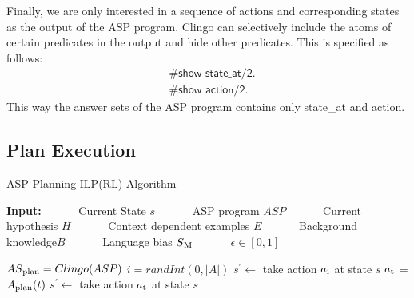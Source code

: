 Finally, we are only interested in a sequence of actions and corresponding states as the output of the ASP program. 
Clingo can selectively include the atoms of certain predicates in the output and hide other predicates. 
This is specified as follows:
\begin{equation}
\begin{split}
&\textsf{\#show state\_at/2.} \\
&\textsf{\#show action/2.}
\end{split}
\end{equation}
This way the answer sets of the ASP program contains only \textsf{state\_at} and \textsf{action}.

\subsection{Plan Execution}
\label{subsec:plan_execution}

\begin{algorithm}[!htb]
\caption{ASP Planning ILP(RL) Algorithm}
\label{algorithm:asp_planning}
\begin{algorithmic}[1]
\label{algo:ILPRL}
\renewcommand{\algorithmicrequire}{\textbf{Input:}}
\State \textbf{Input:}
\State \ \ \ \ \ \ Current State $s$
\State \ \ \ \ \ \ ASP program $ASP$
\State \ \ \ \ \ \ Current hypothesis $H$
\State \ \ \ \ \ \ Context dependent examples $E$
\State \ \ \ \ \ \ Background knowledge$B$
\State \ \ \ \ \ \ Language bias $S\textsubscript{M}$
\State \ \ \ \ \ \ $\epsilon \in [0,1]$

    \State $AS\textsubscript{plan} = Clingo(ASP)$
            \State $i = randInt(0, |A|)$
            \State $s^\prime \leftarrow$ take action $a\textsubscript{i}$ at state $s$
            \Return{}
            \Else \State $a\textsubscript{t}$ = $A\textsubscript{plan}(t)$
            \State $s^\prime \leftarrow$ take action $a\textsubscript{t}$ at state $s$
        \EndIf
    \EndFor
    \Return{}
\EndProcedure

\end{algorithmic}
\end{algorithm}


